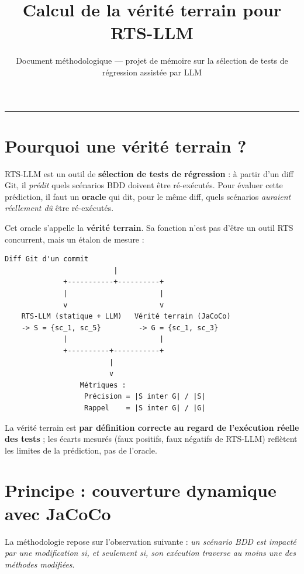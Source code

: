 \documentclass[11pt,a4paper]{article}
\title{\color{accent}\textbf{Calcul de la vérité terrain pour RTS-LLM}}
\author{\textcolor{muted}{\small Document méthodologique --- projet de mémoire sur la sélection de tests de régression assistée par LLM}}
\date{}
\begin{document}
\maketitle
\thispagestyle{empty}

\renewcommand{\contentsname}{Sommaire}
\tableofcontents
\vspace{1em}
\hrule
\vspace{1em}

\section{Pourquoi une vérité terrain ?}
\label{sec:intro}

RTS-LLM est un outil de \textbf{sélection de tests de régression} : à partir d'un diff Git, il \emph{prédit} quels scénarios BDD doivent être ré-exécutés. Pour évaluer cette prédiction, il faut un \textbf{oracle} qui dit, pour le même diff, quels scénarios \emph{auraient réellement dû} être ré-exécutés.

Cet oracle s'appelle la \textbf{vérité terrain}. Sa fonction n'est pas d'être un outil RTS concurrent, mais un étalon de mesure :

\begin{Verbatim}[frame=single,fontsize=\small]
                  Diff Git d'un commit
                          |
              +-----------+----------+
              |                      |
              v                      v
    RTS-LLM (statique + LLM)   Vérité terrain (JaCoCo)
    -> S = {sc_1, sc_5}         -> G = {sc_1, sc_3}
              |                      |
              +----------+-----------+
                         |
                         v
                  Métriques :
                   Précision = |S inter G| / |S|
                   Rappel    = |S inter G| / |G|
\end{Verbatim}

La vérité terrain est \textbf{par définition correcte au regard de l'exécution réelle des tests} ; les écarts mesurés (faux positifs, faux négatifs de RTS-LLM) reflètent les limites de la prédiction, pas de l'oracle.


\section{Principe : couverture dynamique avec JaCoCo}
\label{sec:principe}

La méthodologie repose sur l'observation suivante : \emph{un scénario BDD est impacté par une modification si, et seulement si, son exécution traverse au moins une des méthodes modifiées}.
\end{document}
